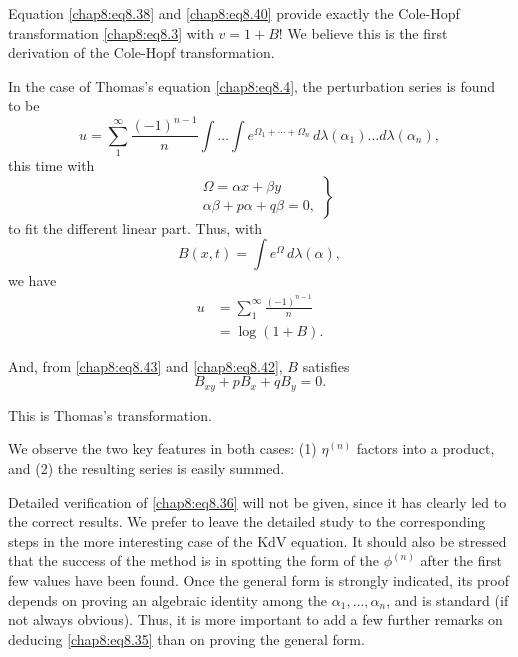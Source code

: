 Equation \eqref{chap8:eq8.38} and \eqref{chap8:eq8.40} provide exactly the Cole-Hopf transformation \eqref{chap8:eq8.3} with $v=1+B!$ We believe this is the first derivation of the Cole-Hopf transformation.

In the case of Thomas's equation \eqref{chap8:eq8.4}, the perturbation series is found to be 
\begin{equation}
u=\sum\limits_1^\infty\frac{(-1)^{n-1}}{n}\int\ldots\int e^{\Omega_1+\cdots+\Omega_n}\,d\lambda(\alpha_1)\ldots d\lambda(\alpha_n), \tag{8.41}\label{chap8:eq8.41}
\end{equation}
this time with
\begin{equation}
\left.
\begin{aligned}
& \Omega =\alpha x+\beta y\\
& \alpha\beta+p\alpha+q\beta =0,
\end{aligned}
\right\}\tag{8.42}\label{chap8:eq8.42}
\end{equation}
to fit the different linear part. Thus, with 
\begin{equation}
B(x,t)=\int e^\Omega\,d\lambda(\alpha),\tag{8.43}\label{chap8:eq8.43}
\end{equation}\pageoriginale
we have
\begin{align*}
u &= \sum\limits_1^\infty\frac{(-1)^{n-1}}{n}\\
&= \log(1+B).
\end{align*}

And, from \eqref{chap8:eq8.43} and \eqref{chap8:eq8.42}, $B$ satisfies
\begin{equation}
B_{xy}+pB_x+qB_y=0.\tag{8.44}\label{chap8:eq8.44}
\end{equation}

This is Thomas's transformation.

We observe the two key features in both cases: (1) $\eta^{(n)}$ factors into a product, and (2) the resulting series is easily summed.

Detailed verification of \eqref{chap8:eq8.36} will not be given, since it has clearly led to the correct results. We prefer to leave the detailed study to the corresponding steps in the more interesting case of the KdV equation. It should also be stressed that the success of the method is in spotting the form of the $\phi^{(n)}$ after the first few values have been found. Once the general form is strongly indicated, its proof depends on proving an algebraic identity among the $\alpha_1,\ldots,\alpha_n$, and is standard (if not always obvious). Thus, it is more important to add a few further remarks on deducing \eqref{chap8:eq8.35} than on proving the general form.

